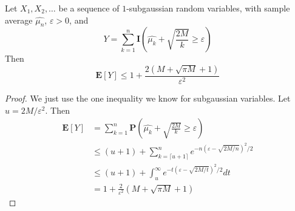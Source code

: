 \begin{lemma}
    Let $X_1, X_2, \dots$ be a sequence of $1$-subgaussian random variables, with sample average $\widehat{\mu_n}$, $\varepsilon > 0$, and
    \[ Y = \sum_{k = 1}^n \mathbf{I} \left(\widehat{\mu_k} + \sqrt{\frac{2M}{k}} \geq \varepsilon \right) \]
    Then
    \[ \mathbf{E}[Y] \leq 1 + \frac{2(M + \sqrt{\pi M} + 1)}{\varepsilon^2} \]
\end{lemma}
\begin{proof}
    We just use the one inequality we know for subgaussian variables. Let $u = 2M/\varepsilon^2$. Then
    \begin{align*}
        \mathbf{E}[Y] &= \sum_{k = 1}^n \mathbf{P} \left(\widehat{\mu_k} + \sqrt{\frac{2 M}{k}} \geq \varepsilon \right)\\
        &\leq (u+1) + \sum_{k = \lceil u + 1 \rceil}^n e^{-n(\varepsilon - \sqrt{2M/n})^2/2}\\
        &\leq (u+1) + \int_u^\infty e^{-t(\varepsilon - \sqrt{2M/t})^2/2} dt\\
        &= 1 + \frac{2}{\varepsilon^2}(M + \sqrt{\pi M} + 1)
    \end{align*}
\end{proof}

